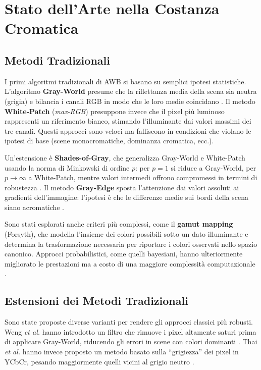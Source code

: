 
\chapter{Stato dell'Arte nella Costanza Cromatica}

\section{Metodi Tradizionali}\label{sec:traditional_methods} %

I primi algoritmi tradizionali di AWB si basano su semplici ipotesi statistiche.
L'algoritmo \textbf{Gray-World} presume che la riflettanza media della scena sia neutra (grigia) e bilancia i canali RGB in modo che le loro medie coincidano \cite{zapryanov_automatic_2012}.
Il metodo \textbf{White-Patch} (\textit{max-RGB}) presuppone invece che il pixel più luminoso rappresenti un riferimento bianco, stimando l'illuminante dai valori massimi dei tre canali.
Questi approcci sono veloci ma falliscono in condizioni che violano le ipotesi di base (scene monocromatiche, dominanza cromatica, ecc.).

Un'estensione è \textbf{Shades-of-Gray}, che generalizza Gray-World e White-Patch usando la norma di Minkowski di ordine $p$: per $p=1$ si riduce a Gray-World, per $p\to \infty$ a White-Patch, mentre valori intermedi offrono compromessi in termini di robustezza \cite{zapryanov_automatic_2012}.
Il metodo \textbf{Gray-Edge} sposta l'attenzione dai valori assoluti ai gradienti dell'immagine: l'ipotesi è che le differenze medie sui bordi della scena siano acromatiche \cite{van_de_weijer_edge-based_2007}. 

Sono stati esplorati anche criteri più complessi, come il \textbf{gamut mapping} (Forsyth), che modella l'insieme dei colori possibili sotto un dato illuminante e determina la trasformazione necessaria per riportare i colori osservati nello spazio canonico.
Approcci probabilistici, come quelli bayesiani, hanno ulteriormente migliorato le prestazioni ma a costo di una maggiore complessità computazionale \cite{gehler_bayesian_2008}.

\section{Estensioni dei Metodi Tradizionali}

Sono state proposte diverse varianti per rendere gli approcci classici più robusti. Weng \textit{et al.} hanno introdotto un filtro che rimuove i pixel altamente saturi prima di applicare Gray-World, riducendo gli errori in scene con colori dominanti \cite{weng_novel_2005}. Thai \textit{et al.} hanno invece proposto un metodo basato sulla ``grigiezza'' dei pixel in YCbCr, pesando maggiormente quelli vicini al grigio neutro \cite{thai_fast_2016}. 


